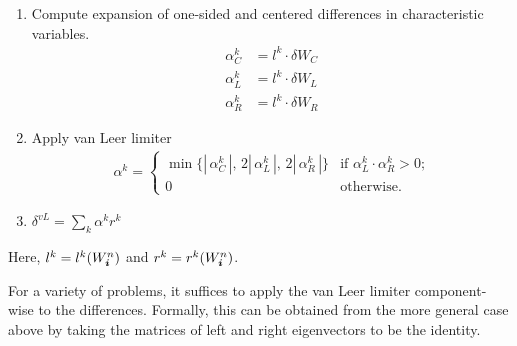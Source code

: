 \begin{enumerate}

\item Compute expansion of one-sided and centered differences in
characteristic variables.
\begin{align*}
\alpha^k_C &= l^k \cdot \delta W_C \\
\alpha^k_L &= l^k \cdot \delta W_L \\
\alpha^k_R &= l^k \cdot \delta W_R
\end{align*}

\item Apply van Leer limiter
\begin{align*}
\alpha^k =
  \begin{cases}
  \min \{  | \, \alpha^k_C \, |, \,
      2 | \, \alpha^k_L \, |, \,
      2 | \, \alpha^k_R \, | \} &
    \text{if $\alpha^k_L \cdot \alpha^k_R > 0$;}
  \\
  0 &
    \text{otherwise.}
  \end{cases}
\end{align*}

\item $\delta^{vL} = \sum_k \alpha^k r^k$
\end{enumerate}

\noindent
Here, $l^k= l^k(W^n_{\boldsymbol{i}})$ and $r^k = r^k(W^n_{\boldsymbol{i}})$.

For a variety of problems, it suffices to apply the van Leer limiter 
component-wise to the differences. Formally,
this can be obtained from the more general
case above by taking the matrices of left and right eigenvectors to be
the identity.

